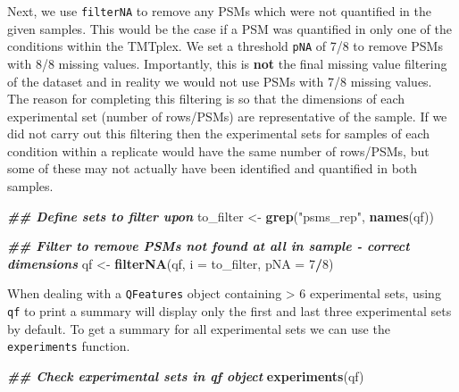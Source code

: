 \documentclass[9pt,a4paper,]{extarticle}
\newenvironment{Shaded}{\begin{snugshade}}{\end{snugshade}}
\newcommand{\AttributeTok}[1]{\textcolor[rgb]{0.13,0.29,0.53}{#1}}
\newcommand{\DecValTok}[1]{\textcolor[rgb]{0.00,0.00,0.81}{#1}}
\newcommand{\DocumentationTok}[1]{\textcolor[rgb]{0.56,0.35,0.01}{\textbf{\textit{#1}}}}
\newcommand{\FunctionTok}[1]{\textcolor[rgb]{0.13,0.29,0.53}{\textbf{#1}}}
\newcommand{\NormalTok}[1]{#1}
\newcommand{\OtherTok}[1]{\textcolor[rgb]{0.56,0.35,0.01}{#1}}
\newcommand{\SpecialCharTok}[1]{\textcolor[rgb]{0.81,0.36,0.00}{\textbf{#1}}}
\newcommand{\StringTok}[1]{\textcolor[rgb]{0.31,0.60,0.02}{#1}}
\begin{document}
Next, we use \texttt{filterNA} to remove any PSMs which were not quantified in the
given samples. This would be the case if a PSM was quantified in only one of the
conditions within the TMTplex. We set a threshold \texttt{pNA} of 7/8 to remove PSMs
with 8/8 missing values. Importantly, this is \textbf{not} the final missing value filtering
of the dataset and in reality we would not use PSMs with 7/8 missing values. The
reason for completing this filtering is so that the dimensions of each experimental
set (number of rows/PSMs) are representative of the sample. If we did not
carry out this filtering then the experimental sets for samples of each condition
within a replicate would have the same number of rows/PSMs, but some of these
may not actually have been identified and quantified in both samples.

\begin{Shaded}
\begin{Highlighting}[]
\DocumentationTok{\#\# Define sets to filter upon }
\NormalTok{to\_filter }\OtherTok{\textless{}{-}} \FunctionTok{grep}\NormalTok{(}\StringTok{"psms\_rep"}\NormalTok{, }\FunctionTok{names}\NormalTok{(qf))}

\DocumentationTok{\#\# Filter to remove PSMs not found at all in sample {-} correct dimensions}
\NormalTok{qf }\OtherTok{\textless{}{-}} \FunctionTok{filterNA}\NormalTok{(qf, }\AttributeTok{i =}\NormalTok{ to\_filter, }\AttributeTok{pNA =} \DecValTok{7}\SpecialCharTok{/}\DecValTok{8}\NormalTok{)}
\end{Highlighting}
\end{Shaded}

When dealing with a \texttt{QFeatures} object containing \textgreater{} 6 experimental sets, using
\texttt{qf} to print a summary will display only the first and last three experimental sets
by default. To get a summary for all experimental sets we can use the
\texttt{experiments} function.

\begin{Shaded}
\begin{Highlighting}[]
\DocumentationTok{\#\# Check experimental sets in qf object}
\FunctionTok{experiments}\NormalTok{(qf)}
\end{Highlighting}
\end{Shaded}
\end{document}

